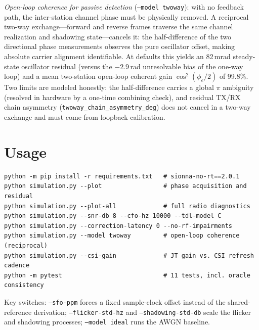 \documentclass[10pt]{article}
\newcommand{\code}[1]{\texttt{#1}}
\begin{document}
\emph{Open-loop coherence for passive detection} (\code{--model twoway}):
with no feedback path, the inter-station channel phase must be physically
removed. A reciprocal two-way exchange---forward and reverse frames traverse
the same channel realization and shadowing state---cancels it: the
half-difference of the two directional phase measurements observes the pure
oscillator offset, making absolute carrier alignment identifiable. At
defaults this yields an 82\,mrad steady-state oscillator residual (versus the
$-2.9$\,rad unresolvable bias of the one-way loop) and a mean two-station
open-loop coherent gain $\cos^2(\phi_e/2)$ of 99.8\%. Two limits are modeled
honestly: the half-difference carries a global $\pi$ ambiguity (resolved in
hardware by a one-time combining check), and residual TX/RX chain asymmetry
(\code{twoway\_chain\_asymmetry\_deg}) does not cancel in a two-way exchange
and must come from loopback calibration.

\section{Usage}
\begin{verbatim}
python -m pip install -r requirements.txt   # sionna-no-rt==2.0.1
python simulation.py --plot                 # phase acquisition and residual
python simulation.py --plot-all             # full radio diagnostics
python simulation.py --snr-db 8 --cfo-hz 10000 --tdl-model C
python simulation.py --correction-latency 0 --no-rf-impairments
python simulation.py --model twoway         # open-loop coherence (reciprocal)
python simulation.py --csi-gain             # JT gain vs. CSI refresh cadence
python -m pytest                            # 11 tests, incl. oracle consistency
\end{verbatim}
Key switches: \code{--sfo-ppm} forces a fixed sample-clock offset instead of
the shared-reference derivation; \code{--flicker-std-hz} and
\code{--shadowing-std-db} scale the flicker and shadowing processes;
\code{--model ideal} runs the AWGN baseline.
\end{document}
